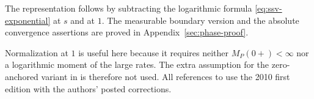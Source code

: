 The representation follows by subtracting the logarithmic formula \eqref{eq:ssv-exponential} at $s$ and at $1$.
The measurable boundary version and the absolute convergence assertions are proved in Appendix~\ref{sec:phase-proof}.

Normalization at \(1\) is useful here because it requires neither \(M_P(0+)<\infty\) nor a logarithmic moment of the large rates.
The extra assumption for the zero-anchored variant in \cite[Remark~6.11, p.~60]{SSV2010} is therefore not used.
All references to \cite{SSV2010} use the 2010 first edition with the authors' posted corrections.

